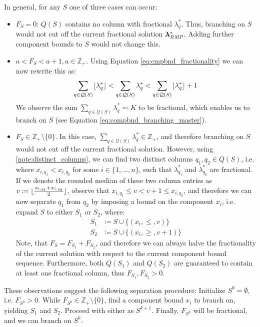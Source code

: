In general, for any $S$ one of three cases can occur:
\begin{itemize}
\item	$F_S = 0$: $Q(S)$ contains no column with fractional $\lambda_q^*$. Thus, branching on $S$ would not cut off the current fractional solution ${\bm{\lambda}}^*_{\textit{RMP}}{}$. Adding further component bounds to $S$ would not change this.
\item	$a < F_S < a + 1, a \in \mathbb{Z}_+$. Using Equation \eqref{eq:cmpbnd_fractionality} we can now rewrite this as:
		\begin{equation}
		\sum_{q \in \mathcal{Q}(S)} \lfloor\lambda_q^*\rfloor < \sum_{q \in \mathcal{Q}(S)} \lambda_q^* < \sum_{q \in \mathcal{Q}(S)} \lfloor\lambda_q^*\rfloor + 1
		\end{equation}
		We observe the sum $\sum_{q \in \mathcal{Q}(S)} \lambda_q^* \eqcolon K$ to be fractional, which enables us to branch on $S$ (see Equation \eqref{eq:compbnd_branching_master}).
\item	$F_S \in \mathbb{Z}_+ \setminus \{0\}$. In this case, $\sum_{q \in \mathcal{Q}(S)} \lambda_q^* \in \mathbb{Z}_+$, and therefore branching on $S$ would not cut off the current fractional solution. However, using \ref{note:distinct_columns}, we can find two distinct columns $q_1, q_2 \in Q(S)$, i.e. where $x_{i,q_1} < x_{i,q_2}$ for some $i \in \{1, \dots, n\}$, such that $\lambda_{q_1}^*$ and $\lambda_{q_2}^*$ are fractional. If we denote the rounded median of these two column entries as $v \coloneqq \lfloor\frac{x_{i,q_1} + x_{i,q_2}}{2}\rfloor$, observe that $x_{i,q_1} \leq v < v + 1 \leq x_{i,q_2}$, and therefore we can now separate $q_1$ from $q_2$ by imposing a bound on the component $x_i$, i.e. expand $S$ to either $S_1$ or $S_2$, where:
		\begin{equation}
		\begin{aligned}
		S_1 &\coloneqq S \cup \{\left( x_i, \leq, v \right)\}\\
		S_2 &\coloneqq S \cup \{\left( x_i, \geq, v + 1 \right)\}
		\end{aligned}
		\end{equation}
		Note, that $F_S = F_{S_1} + F_{S_2}$, and therefore we can always halve the fractionality of the current solution with respect to the current component bound sequence. Furthermore, both $Q(S_1)$ and $Q(S_2)$ are guaranteed to contain at least one fractional column, thus $F_{S_1}, F_{S_2} > 0$.
\end{itemize}

These observations suggest the following separation procedure: Initialize $S^0 = \emptyset$, i.e. $F_{S^0} > 0$. While $F_{S^k} \in \mathbb{Z}_+ \setminus \{0\}$, find a component bound $x_i$ to branch on, yielding $S_1$ and $S_2$. Proceed with either as $S^{k+1}$. Finally, $F_{S^k}$ will be fractional, and we can branch on $S^k$.

